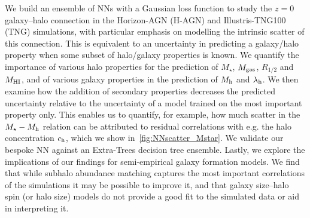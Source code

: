 \documentclass[useAMS,usenatbib]{mnras}
\begin{document}
We build an ensemble of \aclp{NN} with a Gaussian loss function to study the $z=0$ galaxy--halo connection in the Horizon-AGN (H-AGN) and Illustris-TNG100 (TNG) simulations, with particular emphasis on modelling the intrinsic scatter of this connection. This is equivalent to an uncertainty in predicting a galaxy/halo property when some subset of halo/galaxy properties is known. We quantify the importance of various halo properties for the prediction of $M_\star$, $M_{\rm gas}$, $R_{1/2}$ and $M_{\rm HI}$, and of various galaxy properties in the prediction of $M_{\rm h}$ and $\lambda_{\rm h}$. We then examine how the addition of secondary properties decreases the predicted uncertainty relative to the uncertainty of a model trained on the most important property only. This enables us to quantify, for example, how much scatter in the $M_\star - M_{\rm h}$ relation can be attributed to residual correlations with e.g. the halo concentration $c_{\rm h}$, which we show in~\cref{fig:NNscatter_Mstar}. We validate our bespoke \acl{NN} against an Extra-Trees decision tree ensemble. Lastly, we explore the implications of our findings for semi-empirical galaxy formation models. We find that while subhalo abundance matching captures the most important correlations of the simulations it may be possible to improve it, and that galaxy size--halo spin (or halo size) models do not provide a good fit to the simulated data or aid in interpreting it.
\end{document}
